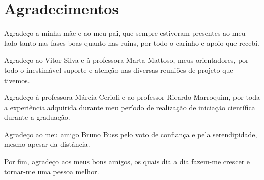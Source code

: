 
\dedication{Dedico esse trabalho aos meus pais, que sempre me apoiaram em tudo o que realizei.}

\chapter*{Agradecimentos}

Agradeço a minha mãe e ao meu pai, que sempre estiveram presentes ao meu lado tanto nas fases boas quanto nas ruins, por todo o carinho e apoio que recebi.

Agradeço ao Vitor Silva e à professora Marta Mattoso, meus orientadores, por todo o inestimável suporte e atenção nas diversas reuniões de projeto que tivemos.

Agradeço à professora Márcia Cerioli e ao professor Ricardo Marroquim, por toda a experiência adquirida durante meu período de realização de iniciação científica durante a graduação.

Agradeço ao meu amigo Bruno Buss pelo voto de confiança e pela serendipidade, mesmo apesar da distância.


Por fim, agradeço aos meus bons amigos, os quais dia a dia fazem-me crescer e tornar-me uma pessoa melhor.